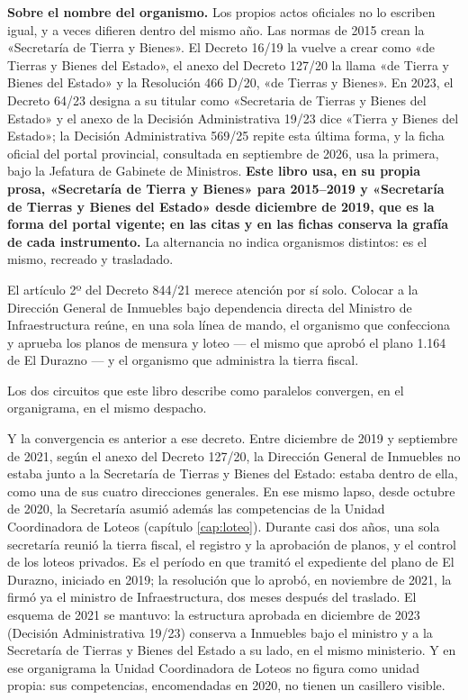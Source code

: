 \begin{cautela}
\textbf{Sobre el nombre del organismo.} Los propios actos oficiales no lo escriben igual, y a veces difieren dentro del mismo año. Las normas de 2015 crean la «Secretaría de Tierra y Bienes». El Decreto 16/19 la vuelve a crear como «de Tierras y Bienes del Estado», el anexo del Decreto 127/20 la llama «de Tierra y Bienes del Estado» y la Resolución 466 D/20, «de Tierras y Bienes». En 2023, el Decreto 64/23 designa a su titular como «Secretaria de Tierras y Bienes del Estado» y el anexo de la Decisión Administrativa 19/23 dice «Tierra y Bienes del Estado»; la Decisión Administrativa 569/25 repite esta última forma, y la ficha oficial del portal provincial, consultada en septiembre de 2026, usa la primera, bajo la Jefatura de Gabinete de Ministros. \textbf{Este libro usa, en su propia prosa, «Secretaría de Tierra y Bienes» para 2015--2019 y «Secretaría de Tierras y Bienes del Estado» desde diciembre de 2019, que es la forma del portal vigente; en las citas y en las fichas conserva la grafía de cada instrumento.} La alternancia no indica organismos distintos: es el mismo, recreado y trasladado.
\end{cautela}

El artículo 2º del Decreto 844/21 merece atención por sí solo. Colocar a la Dirección General de Inmuebles bajo dependencia directa del Ministro de Infraestructura reúne, en una sola línea de mando, el organismo que confecciona y aprueba los planos de mensura y loteo --- el mismo que aprobó el plano 1.164 de El Durazno --- y el organismo que administra la tierra fiscal.

Los dos circuitos que este libro describe como paralelos convergen, en el organigrama, en el mismo despacho.

Y la convergencia es anterior a ese decreto. Entre diciembre de 2019 y septiembre de 2021, según el anexo del Decreto 127/20, la Dirección General de Inmuebles no estaba junto a la Secretaría de Tierras y Bienes del Estado: estaba dentro de ella, como una de sus cuatro direcciones generales. En ese mismo lapso, desde octubre de 2020, la Secretaría asumió además las competencias de la Unidad Coordinadora de Loteos (capítulo \ref{cap:loteo}). Durante casi dos años, una sola secretaría reunió la tierra fiscal, el registro y la aprobación de planos, y el control de los loteos privados. Es el período en que tramitó el expediente del plano de El Durazno, iniciado en 2019; la resolución que lo aprobó, en noviembre de 2021, la firmó ya el ministro de Infraestructura, dos meses después del traslado. El esquema de 2021 se mantuvo: la estructura aprobada en diciembre de 2023 (Decisión Administrativa 19/23) conserva a Inmuebles bajo el ministro y a la Secretaría de Tierras y Bienes del Estado a su lado, en el mismo ministerio. Y en ese organigrama la Unidad Coordinadora de Loteos no figura como unidad propia: sus competencias, encomendadas en 2020, no tienen un casillero visible.

